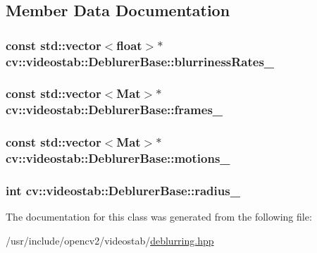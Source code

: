 \subsection{Member Data Documentation}
\hypertarget{classcv_1_1videostab_1_1DeblurerBase_ae51388d21bc3e0babf7fa32a1f0fded2}{
\subsubsection[{blurriness\-Rates\-\_\-}]{\setlength{\rightskip}{0pt plus 5cm}const std\-::vector$<$float$>$$\ast$ cv\-::videostab\-::\-Deblurer\-Base\-::blurriness\-Rates\-\_\-\hspace{0.3cm}{\ttfamily [protected]}}}\label{classcv_1_1videostab_1_1DeblurerBase_ae51388d21bc3e0babf7fa32a1f0fded2}
\hypertarget{classcv_1_1videostab_1_1DeblurerBase_a7829afbbb7562c05a76fb2902e199975}{
\subsubsection[{frames\-\_\-}]{\setlength{\rightskip}{0pt plus 5cm}const std\-::vector$<$Mat$>$$\ast$ cv\-::videostab\-::\-Deblurer\-Base\-::frames\-\_\-\hspace{0.3cm}{\ttfamily [protected]}}}\label{classcv_1_1videostab_1_1DeblurerBase_a7829afbbb7562c05a76fb2902e199975}
\hypertarget{classcv_1_1videostab_1_1DeblurerBase_a076bf2cf50f92bc5e0684810179ed71c}{
\subsubsection[{motions\-\_\-}]{\setlength{\rightskip}{0pt plus 5cm}const std\-::vector$<$Mat$>$$\ast$ cv\-::videostab\-::\-Deblurer\-Base\-::motions\-\_\-\hspace{0.3cm}{\ttfamily [protected]}}}\label{classcv_1_1videostab_1_1DeblurerBase_a076bf2cf50f92bc5e0684810179ed71c}
\hypertarget{classcv_1_1videostab_1_1DeblurerBase_a0af57e0803cb6bc72610185bb837fb58}{
\subsubsection[{radius\-\_\-}]{\setlength{\rightskip}{0pt plus 5cm}int cv\-::videostab\-::\-Deblurer\-Base\-::radius\-\_\-\hspace{0.3cm}{\ttfamily [protected]}}}\label{classcv_1_1videostab_1_1DeblurerBase_a0af57e0803cb6bc72610185bb837fb58}


The documentation for this class was generated from the following file\-:\begin{DoxyCompactItemize}
\item 
/usr/include/opencv2/videostab/\hyperlink{deblurring_8hpp}{deblurring.\-hpp}\end{DoxyCompactItemize}
